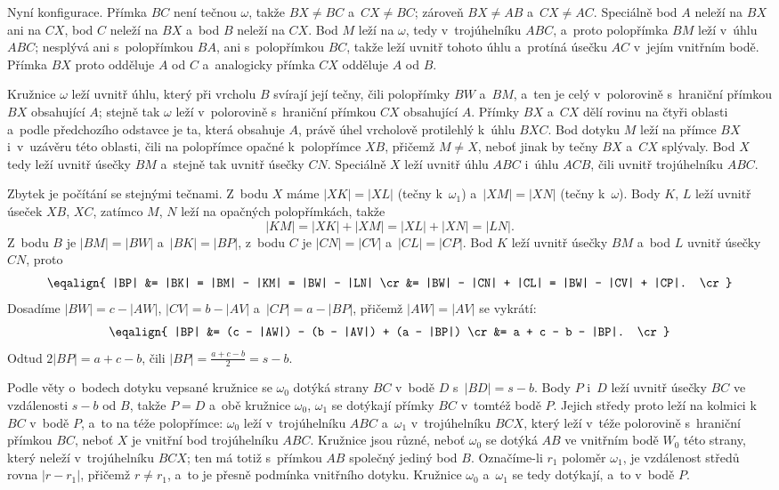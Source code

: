 {    Nyní konfigurace. Přímka $BC$ není tečnou $\omega$, takže $BX \neq BC$ a~$CX \neq BC$; zároveň $BX \neq AB$ a~$CX \neq AC$. Speciálně bod $A$ neleží na $BX$ ani na $CX$, bod $C$ neleží na $BX$ a~bod $B$ neleží na $CX$. Bod $M$ leží na $\omega$, tedy v~trojúhelníku $ABC$, a~proto polopřímka $BM$ leží v~úhlu $ABC$; nesplývá ani s~polopřímkou $BA$, ani s~polopřímkou $BC$, takže leží uvnitř tohoto úhlu a~protíná úsečku $AC$ v~jejím vnitřním bodě. Přímka $BX$ proto odděluje $A$ od $C$ a~analogicky přímka $CX$ odděluje $A$ od $B$.

    Kružnice $\omega$ leží uvnitř úhlu, který při vrcholu $B$ svírají její tečny, čili polopřímky $BW$ a~$BM$, a~ten je celý v~polorovině s~hraniční přímkou $BX$ obsahující $A$; stejně tak $\omega$ leží v~polorovině s~hraniční přímkou $CX$ obsahující $A$. Přímky $BX$ a~$CX$ dělí rovinu na čtyři oblasti a~podle předchozího odstavce je ta, která obsahuje $A$, právě úhel vrcholově protilehlý k~úhlu $BXC$. Bod dotyku $M$ leží na přímce $BX$ i~v~uzávěru této oblasti, čili na polopřímce opačné k~polopřímce $XB$, přičemž $M \neq X$, neboť jinak by tečny $BX$ a~$CX$ splývaly. Bod $X$ tedy leží uvnitř úsečky $BM$ a~stejně tak uvnitř úsečky $CN$. Speciálně $X$ leží uvnitř úhlu $ABC$ i~úhlu $ACB$, čili uvnitř trojúhelníku $ABC$.

    Zbytek je počítání se stejnými tečnami. Z~bodu $X$ máme $|XK| = |XL|$ (tečny k~$\omega_1$) a~$|XM| = |XN|$ (tečny k~$\omega$). Body $K$, $L$ leží uvnitř úseček $XB$, $XC$, zatímco $M$, $N$ leží na opačných polopřímkách, takže
    $$
    |KM| = |XK| + |XM| = |XL| + |XN| = |LN|.
    $$
    Z~bodu $B$ je $|BM| = |BW|$ a~$|BK| = |BP|$, z~bodu $C$ je $|CN| = |CV|$ a~$|CL| = |CP|$. Bod $K$ leží uvnitř úsečky $BM$ a~bod $L$ uvnitř úsečky $CN$, proto
    $$
    \eqalign{
    |BP| &= |BK| = |BM| - |KM| = |BW| - |LN| \cr
         &= |BW| - |CN| + |CL| = |BW| - |CV| + |CP|. \cr
    }
    $$
    Dosadíme $|BW| = c - |AW|$, $|CV| = b - |AV|$ a~$|CP| = a - |BP|$, přičemž $|AW| = |AV|$ se vykrátí:
    $$
    \eqalign{
    |BP| &= (c - |AW|) - (b - |AV|) + (a - |BP|) \cr
         &= a + c - b - |BP|. \cr
    }
    $$
    Odtud $2|BP| = a + c - b$, čili $|BP| = \frac{a+c-b}{2} = s - b$.

    Podle věty o~bodech dotyku vepsané kružnice se $\omega_0$ dotýká strany $BC$ v~bodě $D$ s~$|BD| = s - b$. Body $P$ i~$D$ leží uvnitř úsečky $BC$ ve vzdálenosti $s - b$ od $B$, takže $P = D$ a~obě kružnice $\omega_0$, $\omega_1$ se dotýkají přímky $BC$ v~tomtéž bodě $P$. Jejich středy proto leží na kolmici k~$BC$ v~bodě $P$, a~to na téže polopřímce: $\omega_0$ leží v~trojúhelníku $ABC$ a~$\omega_1$ v~trojúhelníku $BCX$, který leží v~téže polorovině s~hraniční přímkou $BC$, neboť $X$ je vnitřní bod trojúhelníku $ABC$. Kružnice jsou různé, neboť $\omega_0$ se dotýká $AB$ ve vnitřním bodě $W_0$ této strany, který neleží v~trojúhelníku $BCX$; ten má totiž s~přímkou $AB$ společný jediný bod $B$. Označíme-li $r_1$ poloměr $\omega_1$, je vzdálenost středů rovna $|r - r_1|$, přičemž $r \neq r_1$, a~to je přesně podmínka vnitřního dotyku. Kružnice $\omega_0$ a~$\omega_1$ se tedy dotýkají, a~to v~bodě $P$.
}

